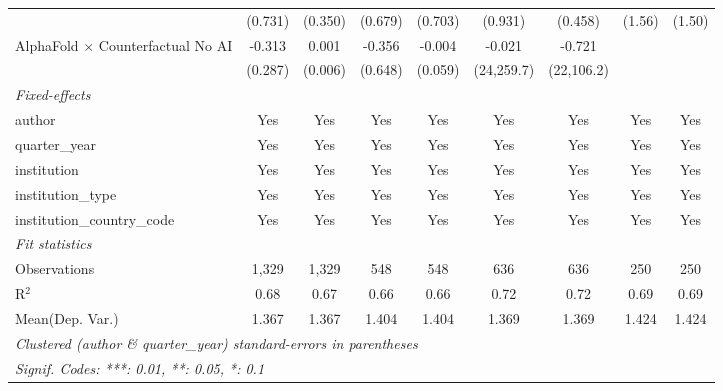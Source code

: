 \begin{tabular}{lcccccccc}
                                            & (0.731)      & (0.350) & (0.679) & (0.703) & (0.931)      & (0.458)     & (1.56)  & (1.50)\\   
   AlphaFold $\times$ Counterfactual No AI  & -0.313       & 0.001   & -0.356  & -0.004  & -0.021       & -0.721      &         &   \\   
                                            & (0.287)      & (0.006) & (0.648) & (0.059) & (24,259.7)   & (22,106.2)  &         &   \\   
   \midrule
   \emph{Fixed-effects}\\
   author                                   & Yes          & Yes     & Yes     & Yes     & Yes          & Yes         & Yes     & Yes\\  
   quarter\_year                            & Yes          & Yes     & Yes     & Yes     & Yes          & Yes         & Yes     & Yes\\  
   institution                              & Yes          & Yes     & Yes     & Yes     & Yes          & Yes         & Yes     & Yes\\  
   institution\_type                        & Yes          & Yes     & Yes     & Yes     & Yes          & Yes         & Yes     & Yes\\  
   institution\_country\_code               & Yes          & Yes     & Yes     & Yes     & Yes          & Yes         & Yes     & Yes\\  
   \midrule
   \emph{Fit statistics}\\
   Observations                             & 1,329        & 1,329   & 548     & 548     & 636          & 636         & 250     & 250\\  
   R$^2$                                    & 0.68         & 0.67    & 0.66    & 0.66    & 0.72         & 0.72        & 0.69    & 0.69\\  
Mean(Dep. Var.) & 1.367 & 1.367 & 1.404 & 1.404 & 1.369 & 1.369 & 1.424 & 1.424 \\
   \midrule \midrule
   \multicolumn{9}{l}{\emph{Clustered (author \& quarter\_year) standard-errors in parentheses}}\\
   \multicolumn{9}{l}{\emph{Signif. Codes: ***: 0.01, **: 0.05, *: 0.1}}\\
\end{tabular}
\par\endgroup
